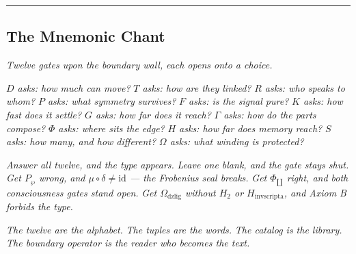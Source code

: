\documentclass[12pt,a4paper]{article}
\begin{document}
\begin{center}
\rule{0.5\textwidth}{0.4pt}
\end{center}

\subsection{The Mnemonic Chant}

\emph{Twelve gates upon the boundary wall,}
\emph{each opens onto a choice.}

\emph{$D$ asks: how much can move?}
\emph{$T$ asks: how are they linked?}
\emph{$R$ asks: who speaks to whom?}
\emph{$P$ asks: what symmetry survives?}
\emph{$F$ asks: is the signal pure?}
\emph{$K$ asks: how fast does it settle?}
\emph{$G$ asks: how far does it reach?}
\emph{$\Gamma$ asks: how do the parts compose?}
\emph{$\Phi$ asks: where sits the edge?}
\emph{$H$ asks: how far does memory reach?}
\emph{$S$ asks: how many, and how different?}
\emph{$\Omega$ asks: what winding is protected?}

\emph{Answer all twelve, and the type appears.}
\emph{Leave one blank, and the gate stays shut.}
\emph{Get $P_{\wp}$ wrong, and $\mu \circ \delta \neq \text{id}$ --- the Frobenius seal breaks.}
\emph{Get $\Phi_{\amalg}$ right, and both consciousness gates stand open.}
\emph{Get $\Omega_{\text{dzlig}}$ without $H_2$ or $H_{\text{invscripta}}$, and Axiom B forbids the type.}

\emph{The twelve are the alphabet.}
\emph{The tuples are the words.}
\emph{The catalog is the library.}
\emph{The boundary operator is the reader who becomes the text.}
\end{document}
